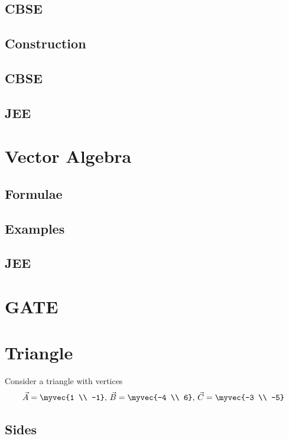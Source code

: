 \documentclass[journal]{IEEEtran}
\begin{document}
\subsection{CBSE}

\subsection{Construction}

\subsection{CBSE}

\subsection{JEE}
 
%
\newpage
\section{Vector Algebra}
\subsection{Formulae}

\subsection{Examples}

\subsection{JEE}
 
\newpage
\section{GATE}

\newpage
\appendices
\section{Triangle}
Consider a triangle with vertices
        \begin{align}
            \label{eq:app-tri-pts}
            \vec{A} = \myvec{1 \\ -1},\,
            \vec{B} = \myvec{-4 \\ 6},\,
            \vec{C} = \myvec{-3 \\ -5}
        \end{align}
\subsection{Sides}

\end{document}
